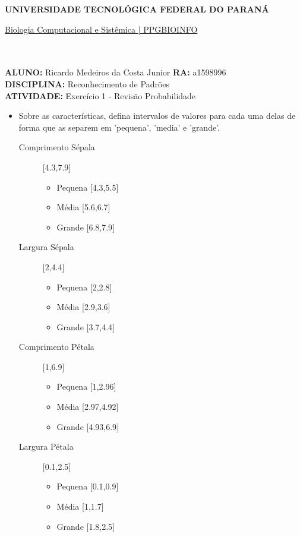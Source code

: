 \documentclass[a4paper, 12pt]{article}
\begin{document}
\textbf{UNIVERSIDADE TECNOLÓGICA FEDERAL DO PARANÁ}\\
\centerline{\underline{Biologia Computacional e Sistêmica | PPGBIOINFO}}\\\\
\textbf{ALUNO:} Ricardo Medeiros da Costa Junior   \textbf{RA:} a1598996 \\
\textbf{DISCIPLINA:} Reconhecimento de Padrões\\
\textbf{ATIVIDADE:} Exercício 1 - Revisão Probabilidade \\
\begin{itemize} 
\item Sobre as características, defina intervalos de valores para cada uma delas de forma que as separem em 'pequena', 'media' e 'grande'.
  \begin{description}
  \item[Comprimento Sépala ] [4.3,7.9]
    \begin{itemize}
    \item Pequena {[}4.3,5.5{]}
    \item Média {[}5.6,6.7{]}
    \item Grande {[}6.8,7.9{]}      
    \end{itemize}
  \end{description}
  \begin{description}
  \item[Largura Sépala ] [2,4.4]
    \begin{itemize}
    \item Pequena {[}2,2.8{]}
    \item Média {[}2.9,3.6{]}
    \item Grande {[}3.7,4.4{]}      
    \end{itemize}
  \end{description}
  \begin{description}
  \item[Comprimento Pétala ] [1,6.9]
    \begin{itemize}
    \item Pequena {[}1,2.96{]}
    \item Média {[}2.97,4.92{]}
    \item Grande {[}4.93,6.9{]}      
    \end{itemize}
  \end{description}
  \begin{description}
  \item[Largura Pétala ] [0.1,2.5]
    \begin{itemize}
    \item Pequena {[}0.1,0.9{]}
    \item Média {[}1,1.7{]}
    \item Grande {[}1.8,2.5{]}      
    \end{itemize}
  \end{description}


\end{itemize}
\end{document}
